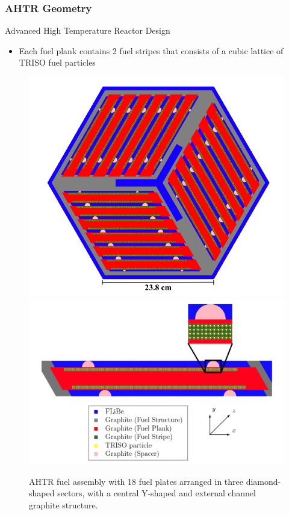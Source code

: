 \begin{frame}
  \frametitle{AHTR Geometry}
  \begin{block}{Advanced High Temperature Reactor Design}
    \begin{itemize}
      \item Each fuel plank contains 2 fuel stripes that consists of a cubic 
      lattice of TRISO fuel particles
    \end{itemize}
  \end{block}
  \vspace{-0.3cm}
  \begin{figure}[]
    \includegraphics[width=0.45\linewidth]{figures/ahtr-assembly.png} 
    \includegraphics[width=0.45\linewidth]{figures/ahtr-plank.png} 
    \caption{\acrfull{AHTR} fuel assembly with 18 fuel plates arranged in 
    three diamond-shaped sectors, with a central Y-shaped and external channel 
    graphite structure.}
\end{figure}
\end{frame}

